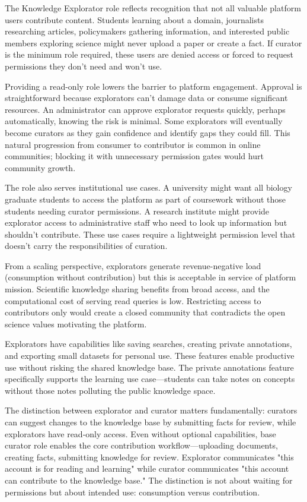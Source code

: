 \documentclass[12pt,a4paper]{article}
\begin{document}
The Knowledge Explorator role reflects recognition that not all valuable platform users contribute content. Students learning about a domain, journalists researching articles, policymakers gathering information, and interested public members exploring science might never upload a paper or create a fact. If curator is the minimum role required, these users are denied access or forced to request permissions they don't need and won't use.

Providing a read-only role lowers the barrier to platform engagement. Approval is straightforward because explorators can't damage data or consume significant resources. An administrator can approve explorator requests quickly, perhaps automatically, knowing the risk is minimal. Some explorators will eventually become curators as they gain confidence and identify gaps they could fill. This natural progression from consumer to contributor is common in online communities; blocking it with unnecessary permission gates would hurt community growth.

The role also serves institutional use cases. A university might want all biology graduate students to access the platform as part of coursework without those students needing curator permissions. A research institute might provide explorator access to administrative staff who need to look up information but shouldn't contribute. These use cases require a lightweight permission level that doesn't carry the responsibilities of curation.

From a scaling perspective, explorators generate revenue-negative load (consumption without contribution) but this is acceptable in service of platform mission. Scientific knowledge sharing benefits from broad access, and the computational cost of serving read queries is low. Restricting access to contributors only would create a closed community that contradicts the open science values motivating the platform.

Explorators have capabilities like saving searches, creating private annotations, and exporting small datasets for personal use. These features enable productive use without risking the shared knowledge base. The private annotations feature specifically supports the learning use case—students can take notes on concepts without those notes polluting the public knowledge space.

The distinction between explorator and curator matters fundamentally: curators can suggest changes to the knowledge base by submitting facts for review, while explorators have read-only access. Even without optional capabilities, base curator role enables the core contribution workflow—uploading documents, creating facts, submitting knowledge for review. Explorator communicates "this account is for reading and learning" while curator communicates "this account can contribute to the knowledge base." The distinction is not about waiting for permissions but about intended use: consumption versus contribution.
\end{document}
